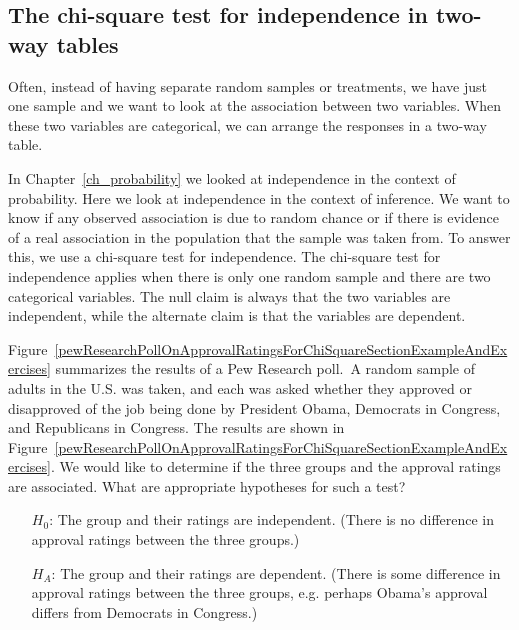 \D{\newpage}

\subsection{The chi-square test for independence in two-way tables}

Often, instead of having separate random samples or treatments, we have just one sample and we want to look at the association between two variables.  When these two variables are categorical, we can arrange the responses in a two-way table.  

In Chapter~\ref{ch_probability} we looked at independence in the context of probability.  Here we look at independence in the context of inference.  We want to know if any observed association is due to random chance or if there is evidence of a real association in the population that the sample was taken from.  To answer this, we use a chi-square test for independence.  The chi-square test for independence applies when there is only one random sample and there are two categorical variables.  The null claim is always that the two variables are independent, while the alternate claim is that the variables are dependent.


\begin{examplewrap}
\begin{nexample}
{Figure~\ref{pewResearchPollOnApprovalRatingsForChiSquareSectionExampleAndExercises} summarizes the results of a Pew Research poll.\footnotemark\, A random sample of adults in the U.S. was taken, and each was asked whether they approved or disapproved of the job being done by President Obama, Democrats in Congress, and Republicans in Congress.  The results are shown in Figure~\ref{pewResearchPollOnApprovalRatingsForChiSquareSectionExampleAndExercises}.  We would like to determine if the three groups and the approval ratings are associated. What are appropriate hypotheses for such a test?\label{hypothesisTestSetupForPewResearchPollOnApprovalRatingsForChiSquareSection}}
\begin{itemize}
\item[$H_0$:] The group and their ratings are independent. (There is no difference in approval ratings between the three groups.)
\item[$H_A$:] The group and their ratings are dependent. (There is some difference in approval ratings between the three groups, e.g. perhaps Obama's approval differs from Democrats in Congress.)
\end{itemize}
\end{nexample}
\end{examplewrap}

